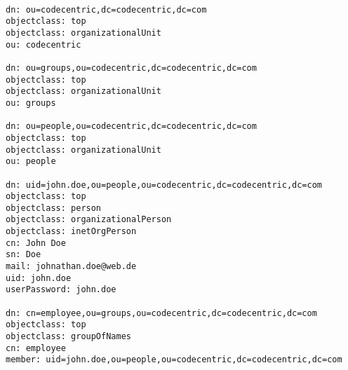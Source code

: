 \begin{lstlisting}

dn: ou=codecentric,dc=codecentric,dc=com
objectclass: top
objectclass: organizationalUnit
ou: codecentric

dn: ou=groups,ou=codecentric,dc=codecentric,dc=com
objectclass: top
objectclass: organizationalUnit
ou: groups

dn: ou=people,ou=codecentric,dc=codecentric,dc=com
objectclass: top
objectclass: organizationalUnit
ou: people

dn: uid=john.doe,ou=people,ou=codecentric,dc=codecentric,dc=com
objectclass: top
objectclass: person
objectclass: organizationalPerson
objectclass: inetOrgPerson
cn: John Doe
sn: Doe
mail: johnathan.doe@web.de
uid: john.doe
userPassword: john.doe

dn: cn=employee,ou=groups,ou=codecentric,dc=codecentric,dc=com
objectclass: top
objectclass: groupOfNames
cn: employee
member: uid=john.doe,ou=people,ou=codecentric,dc=codecentric,dc=com

\end{lstlisting}